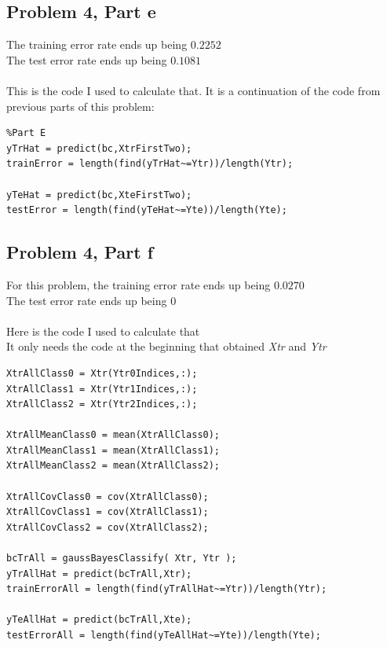 \documentclass[11pt,psfig]{article}
\begin{document}
\newpage

\subsection*{Problem 4, Part e}

The training error rate ends up being $0.2252$\\
The test error rate ends up being $0.1081$\\
\\
This is the code I used to calculate that. It is a continuation of the code from previous parts of this problem:
\begin{verbatim}
%Part E
yTrHat = predict(bc,XtrFirstTwo);
trainError = length(find(yTrHat~=Ytr))/length(Ytr);

yTeHat = predict(bc,XteFirstTwo);
testError = length(find(yTeHat~=Yte))/length(Yte);
\end{verbatim}

\newpage

\subsection*{Problem 4, Part f}

For this problem, the training error rate ends up being $0.0270$\\
The test error rate ends up being $0$\\
\\
Here is the code I used to calculate that\\
It only needs the code at the beginning that obtained {\it Xtr} and {\it Ytr}
\begin{verbatim}
XtrAllClass0 = Xtr(Ytr0Indices,:);
XtrAllClass1 = Xtr(Ytr1Indices,:);
XtrAllClass2 = Xtr(Ytr2Indices,:);

XtrAllMeanClass0 = mean(XtrAllClass0);
XtrAllMeanClass1 = mean(XtrAllClass1);
XtrAllMeanClass2 = mean(XtrAllClass2);

XtrAllCovClass0 = cov(XtrAllClass0);
XtrAllCovClass1 = cov(XtrAllClass1);
XtrAllCovClass2 = cov(XtrAllClass2);

bcTrAll = gaussBayesClassify( Xtr, Ytr );
yTrAllHat = predict(bcTrAll,Xtr);
trainErrorAll = length(find(yTrAllHat~=Ytr))/length(Ytr);

yTeAllHat = predict(bcTrAll,Xte);
testErrorAll = length(find(yTeAllHat~=Yte))/length(Yte);
\end{verbatim}
\end{document}
